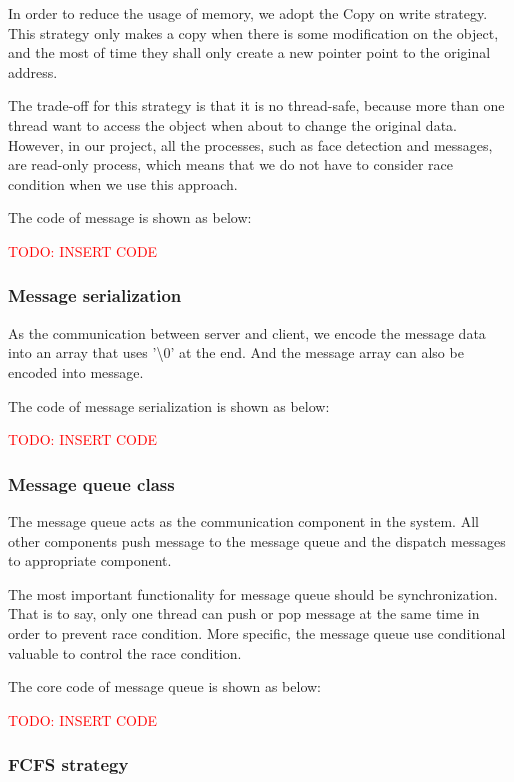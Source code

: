 \documentclass[11pt,a4paper,titlepage]{report}
\begin{document}
In order to reduce the usage of memory, we adopt the Copy on write strategy. This strategy only makes a copy when there is some modification on the object, and the most of time they shall only create a new pointer point to the original address.

The trade-off for this strategy is that it is no thread-safe, because more than one thread want to access the object when about to change the original data. However, in our project, all the processes, such as face detection and messages, are read-only process, which means that we do not have to consider race condition when we use this approach. 

The code of message is shown as below:


\textcolor{red}{TODO: INSERT CODE}

\subsubsection{Message serialization}

As the communication between server and client, we encode the message data into an array that uses '\textbackslash0' at the end. And the message array can also be encoded into message.

The code of message serialization is shown as below:

\textcolor{red}{TODO: INSERT CODE}


\subsubsection{Message queue class}

The message queue acts as the communication component in the system. All other components push message to the message queue and the dispatch messages to appropriate component. 

The most important functionality for message queue should be synchronization. That is to say, only one thread can push or pop message at the same time in order to prevent race condition. More specific, the message queue use conditional valuable to control the race condition. 

The core code of message queue is shown as below:

\textcolor{red}{TODO: INSERT CODE}


\subsubsection{FCFS strategy}
\end{document}
